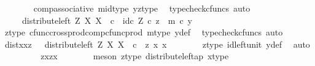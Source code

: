\begin{isabellebody}
\ \ \ \ \ \ \isamarkupfalse%
\ comp{\isacharunderscore}{\kern0pt}associative{}\ mid{\isacharunderscore}{\kern0pt}type\ yz{\isacharunderscore}{\kern0pt}type\ \isamarkupfalse%
\ {\isacharparenleft}{\kern0pt}typecheck{\isacharunderscore}{\kern0pt}cfuncs{\isacharcomma}{\kern0pt}\ auto{\isacharparenright}{\kern0pt}\isanewline
\ \ \ \ \isamarkupfalse%
\ \isamarkupfalse%
\ {\isachardoublequoteopen}{\isachardot}{\kern0pt}{\isachardot}{\kern0pt}{\isachardot}{\kern0pt}\ \ {\isacharequal}{\kern0pt}\ \ distribute{\isacharunderscore}{\kern0pt}left\ Z\ X\ X\ \ {\isasymcirc}\isactrlsub c\ \ {\isasymlangle}id\isactrlsub c\ Z\ {\isasymcirc}\isactrlsub c\ z\ {\isacharcomma}{\kern0pt}\ m\ {\isasymcirc}\isactrlsub c\ y\ {\isasymrangle}{\isachardoublequoteclose}\isanewline
\ \ \ \ \ \ \isamarkupfalse%
\ z{\isacharunderscore}{\kern0pt}type\ cfunc{\isacharunderscore}{\kern0pt}cross{\isacharunderscore}{\kern0pt}prod{\isacharunderscore}{\kern0pt}comp{\isacharunderscore}{\kern0pt}cfunc{\isacharunderscore}{\kern0pt}prod\ m{\isacharunderscore}{\kern0pt}type\ y{\isacharunderscore}{\kern0pt}def\ \isamarkupfalse%
\ {\isacharparenleft}{\kern0pt}typecheck{\isacharunderscore}{\kern0pt}cfuncs{\isacharcomma}{\kern0pt}\ auto{\isacharparenright}{\kern0pt}\isanewline
\ \ \ \ \isamarkupfalse%
\ \isamarkupfalse%
\ distxxz{\isacharcolon}{\kern0pt}\ {\isachardoublequoteopen}{\isachardot}{\kern0pt}{\isachardot}{\kern0pt}{\isachardot}{\kern0pt}\ {\isacharequal}{\kern0pt}\ distribute{\isacharunderscore}{\kern0pt}left\ Z\ X\ X\ \ {\isasymcirc}\isactrlsub c\ \ {\isasymlangle}z{\isacharcomma}{\kern0pt}\ {\isasymlangle}x{\isacharcomma}{\kern0pt}\ x{\isasymrangle}{\isasymrangle}{\isachardoublequoteclose}\isanewline
\ \ \ \ \ \ \isamarkupfalse%
\ z{\isacharunderscore}{\kern0pt}type\ id{\isacharunderscore}{\kern0pt}left{\isacharunderscore}{\kern0pt}unit{}\ y{\isacharunderscore}{\kern0pt}def\ \isamarkupfalse%
\ auto\isanewline
\ \ \ \ \isamarkupfalse%
\ \isamarkupfalse%
\ {\isachardoublequoteopen}{\isachardot}{\kern0pt}{\isachardot}{\kern0pt}{\isachardot}{\kern0pt}\ {\isacharequal}{\kern0pt}\ {\isasymlangle}{\isasymlangle}z{\isacharcomma}{\kern0pt}x{\isasymrangle}{\isacharcomma}{\kern0pt}{\isasymlangle}z{\isacharcomma}{\kern0pt}x{\isasymrangle}{\isasymrangle}{\isachardoublequoteclose}\isanewline
\ \ \ \ \ \ \isamarkupfalse%
\ {\isacharparenleft}{\kern0pt}meson\ z{\isacharunderscore}{\kern0pt}type\ distribute{\isacharunderscore}{\kern0pt}left{\isacharunderscore}{\kern0pt}ap\ x{\isacharunderscore}{\kern0pt}type{\isacharparenright}{\kern0pt}\isanewline

\end{isabellebody}
